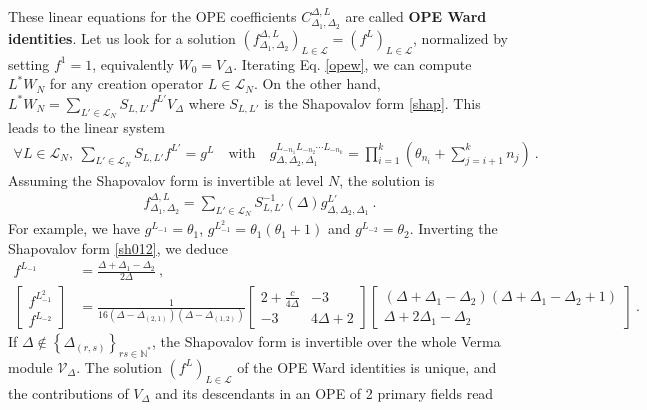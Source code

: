 \documentclass[12pt, a4paper]{article}
\newcommand{\myindex}[1]{\textbf{\boldmath #1}}
\begin{document}
These linear equations for the OPE coefficients $C^{\Delta,L}_{\Delta_1,\Delta_2}$ are called \myindex{OPE Ward identities}. 
Let us look for a solution $\left(f^{\Delta,L}_{\Delta_1,\Delta_2}\right)_{L\in\mathcal{L}}=\left(f^L\right)_{L\in\mathcal{L}}$, normalized by setting $f^{1}=1$, equivalently $W_0 = V_\Delta$. Iterating Eq. \eqref{opew}, we can compute $L^*W_N$ for any creation operator $L\in\mathcal{L}_N$. On the other hand, $L^*W_N = \sum_{L'\in\mathcal{L}_N} S_{L,L'} f^{L'}V_\Delta$ where $S_{L,L'}$ is the Shapovalov form \eqref{shap}.
This leads to the linear system 
\begin{align}
 \forall L\in \mathcal{L}_N, \ \sum_{L'\in\mathcal{L}_N} S_{L,L'} f^{L'} = g^L \quad \text{with} \quad 
 g^{L_{-n_1}L_{-n_2}\cdots L_{-n_k}}_{\Delta,\Delta_2,\Delta_1} = \prod_{i=1}^k \left(\theta_{n_i}+\textstyle{\sum}_{j=i+1}^k n_j\right)
 \ .
 \label{sgl}
\end{align}
Assuming the Shapovalov form is invertible at level $N$, the solution is
\begin{align}
 \boxed{f^{\Delta,L}_{\Delta_1,\Delta_2} = \sum_{L'\in\mathcal{L}_{N}} S_{L,L'}^{-1}(\Delta) g^{L'}_{\Delta,\Delta_2,\Delta_1}}\ .
 \label{fsg}
\end{align}
For example, we have $g^{L_{-1}} = \theta_{1}$, $g^{L_{-1}^2} = \theta_{1}(\theta_{1}+1)$ and $g^{L_{-2}}=\theta_{2}$.
Inverting the Shapovalov form \eqref{sh012}, we deduce
\begin{subequations}
 \label{fl12}
 \begin{align}
  f^{L_{-1}} & = \frac{\Delta+\Delta_1-\Delta_2}{2\Delta}\ ,
  \label{fl1}
  \\
  \left[\begin{smallmatrix}
 f^{L_{-1}^2} \\ f^{L_{-2}} 
 \end{smallmatrix}\right] 
 & =
   \frac{1}{16(\Delta-\Delta_{(2,1)})(\Delta-\Delta_{(1,2)})}
\left[\begin{smallmatrix} 2+\frac{c}{4\Delta} & -3 \\ -3 & 4\Delta+2 \end{smallmatrix}\right]
\left[\begin{smallmatrix} (\Delta+\Delta_1-\Delta_2)(\Delta+\Delta_1-\Delta_2+1) \\ \Delta+2\Delta_1-\Delta_2 \end{smallmatrix}\right] \ .
\label{fl2}
 \end{align}
\end{subequations}
If $\Delta\notin\left\{\Delta_{(r,s)}\right\}_{rs\in\mathbb{N}^*}$, the Shapovalov form is invertible over the whole Verma module $\mathcal{V}_\Delta$. The solution $\left(f^L\right)_{L\in\mathcal{L}}$ of the OPE Ward identities is unique, and the contributions of $V_\Delta$ and its descendants in an OPE of 2 primary fields read
\end{document}
